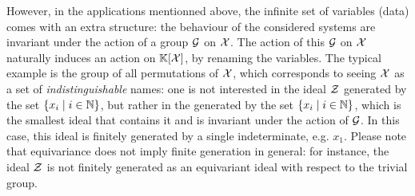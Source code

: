 \AP However, in the applications mentionned above, the infinite set of
variables (data) comes with an extra structure: the behaviour of the considered
systems are invariant under the action of a group $\mathcal{G}$ on $\mathcal{X}$. The action
of this $\mathcal{G}$ on $\mathcal{X}$ naturally induces an action on $\mathbb{K}[\mathcal{X}]$, by
renaming the variables. The typical example is the group of all permutations of
$\mathcal{X}$, which corresponds to seeing $\mathcal{X}$ as a set of \emph{indistinguishable}
names: one is not interested in the ideal $\mathcal{Z}$ generated by the set
$\{ x_i \mid i \in \mathbb{N} \}$, but rather in the  generated by
the set $\{ x_i \mid i \in \mathbb{N} \}$, which is the smallest ideal that contains it
and is invariant under the action of $\mathcal{G}$. In this case, this ideal is
finitely generated by a single indeterminate, e.g. $x_1$. Please note that
equivariance does not imply finite generation in general: for instance, the
ideal $\mathcal{Z}$ is not finitely generated as an equivariant ideal with respect to
the trivial group.
%
%
